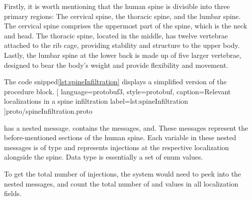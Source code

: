 Firstly, it is worth mentioning that the human spine is divisible into three primary regions:
The cervical spine, the thoracic spine, and the lumbar spine.
The cervical spine comprises the uppermost part of the spine, which is the neck and head.
The thoracic spine, located in the middle, has twelve vertebrae attached to the rib cage, providing stability and structure to the upper body.
Lastly, the lumbar spine at the lower back is made up of five larger vertebrae, designed to bear the body's weight and provide flexibility and movement.


The code snipped\ref{lst:spineInfiltration} displays a simplified version of the procedure block.
[
    language=protobuf3,
    style=protobuf,
    caption={Relevant localizations in a spine infiltration}
    label={lst:spineInfiltration}
]{proto/spineInfiltration.proto}

 has a nested message.
 contains the messages, and.
These messages represent the before-mentioned sections of the human spine.
Each variable in these nested messages is of type and represents injections at the respective localization alongside the spine.
Data type is essentially a set of enum values.

To get the total number of injections, the system would need to peek into the nested messages, and count the total number of and values in all localization fields.

